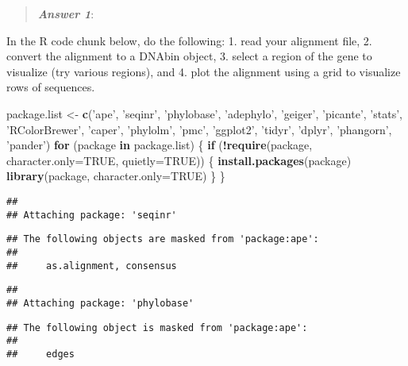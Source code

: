 \documentclass[]{article}
\newenvironment{Shaded}{\begin{snugshade}}{\end{snugshade}}
\newcommand{\KeywordTok}[1]{\textcolor[rgb]{0.13,0.29,0.53}{\textbf{#1}}}
\newcommand{\DataTypeTok}[1]{\textcolor[rgb]{0.13,0.29,0.53}{#1}}
\newcommand{\StringTok}[1]{\textcolor[rgb]{0.31,0.60,0.02}{#1}}
\newcommand{\OtherTok}[1]{\textcolor[rgb]{0.56,0.35,0.01}{#1}}
\newcommand{\ControlFlowTok}[1]{\textcolor[rgb]{0.13,0.29,0.53}{\textbf{#1}}}
\newcommand{\OperatorTok}[1]{\textcolor[rgb]{0.81,0.36,0.00}{\textbf{#1}}}
\newcommand{\NormalTok}[1]{#1}
\begin{document}
\begin{quote}
\textbf{\emph{Answer 1}}:
\end{quote}

In the R code chunk below, do the following: 1. read your alignment
file, 2. convert the alignment to a DNAbin object, 3. select a region of
the gene to visualize (try various regions), and 4. plot the alignment
using a grid to visualize rows of sequences.

\begin{Shaded}
\begin{Highlighting}[]
\NormalTok{package.list <-}\StringTok{ }\KeywordTok{c}\NormalTok{(}\StringTok{'ape'}\NormalTok{, }\StringTok{'seqinr'}\NormalTok{, }\StringTok{'phylobase'}\NormalTok{, }\StringTok{'adephylo'}\NormalTok{, }\StringTok{'geiger'}\NormalTok{, }\StringTok{'picante'}\NormalTok{, }\StringTok{'stats'}\NormalTok{, }\StringTok{'RColorBrewer'}\NormalTok{, }\StringTok{'caper'}\NormalTok{, }\StringTok{'phylolm'}\NormalTok{, }\StringTok{'pmc'}\NormalTok{, }\StringTok{'ggplot2'}\NormalTok{, }\StringTok{'tidyr'}\NormalTok{, }\StringTok{'dplyr'}\NormalTok{, }\StringTok{'phangorn'}\NormalTok{, }\StringTok{'pander'}\NormalTok{) }
\ControlFlowTok{for}\NormalTok{ (package }\ControlFlowTok{in}\NormalTok{ package.list) \{}
  \ControlFlowTok{if}\NormalTok{ (}\OperatorTok{!}\KeywordTok{require}\NormalTok{(package, }\DataTypeTok{character.only=}\OtherTok{TRUE}\NormalTok{, }\DataTypeTok{quietly=}\OtherTok{TRUE}\NormalTok{)) \{}
    \KeywordTok{install.packages}\NormalTok{(package)}
    \KeywordTok{library}\NormalTok{(package, }\DataTypeTok{character.only=}\OtherTok{TRUE}\NormalTok{)}
\NormalTok{  \}}
\NormalTok{\}}
\end{Highlighting}
\end{Shaded}

\begin{verbatim}
## 
## Attaching package: 'seqinr'
\end{verbatim}

\begin{verbatim}
## The following objects are masked from 'package:ape':
## 
##     as.alignment, consensus
\end{verbatim}

\begin{verbatim}
## 
## Attaching package: 'phylobase'
\end{verbatim}

\begin{verbatim}
## The following object is masked from 'package:ape':
## 
##     edges
\end{verbatim}
\end{document}

